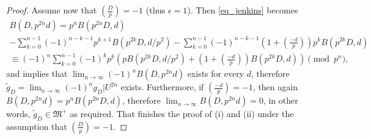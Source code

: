 \documentclass[10pt,a4paper]{amsart}
\newcommand{\gM}{{\mathfrak M}}
\begin{document}
\begin{proof}
Assume now that  $\left(\frac{D}{p} \right) =-1$ (thus $\epsilon=1$).  Then \eqref{eq_jenkins} becomes
\begin{multline*} 
B(D, p^{2n}d) =  p^nB(p^{2n}D,d)   \\ - \sum_{k=0}^{n-1} (-1)^{n-k-1}p^{k+1}B(p^{2k}D,d/p^2)  -  \sum_{k=0}^{n-1}  (-1)^{n-k-1} \left( 1 + \left( \frac{-d}{p} \right) \right) p^k B(p^{2k}D,d) \\
\equiv (-1)^{n} \sum_{k=0}^{n-1} (-1)^k p^k \left( pB(p^{2k}D,d/p^2) + \left( 1+ \left(\frac{-d}{p} \right) \right)B(p^{2k}D,d) \right) \pmod{p^n},
\end{multline*}
and implies that $\lim_{n \rightarrow \infty} (-1)^nB(D,p^{2n}d)$ exists for every $d$, therefore $\tilde{g}_D= \lim_{n \rightarrow \infty} (-1)^ng_D|U^{2n}$ exists.
Furthermore,  if $ \left( \frac{-d}{p} \right) = -1$, then again $B(D, p^{2n}d) = p^nB(p^{2n}D,d)$, therefore $\lim_{n \rightarrow \infty} B(D, p^{2n}d) =0$,
in other words, $\tilde{g}_D \in \gM^+$ as required. That finishes the proof of (i) and (ii) under the assumption that  $\left(\frac{D}{p} \right) =-1$.
\end{proof}
\end{document}
